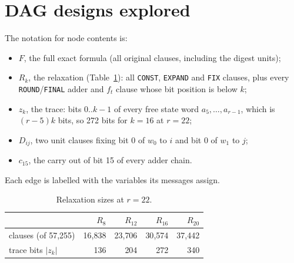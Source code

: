 \documentclass[11pt,a4paper]{article}
\begin{document}
\section{DAG designs explored}\label{sec:dags}

The notation for node contents is:
\begin{itemize}
\item $F$, the full exact formula (all original clauses, including the digest units);
\item $R_k$, the relaxation (Table~\ref{tab:relax}): all \texttt{CONST}, \texttt{EXPAND} and
\texttt{FIX} clauses, plus every \texttt{ROUND}/\texttt{FINAL} adder and $f_t$ clause whose bit
position is below $k$;
\item $z_k$, the trace: bits $0..k-1$ of every free state word $a_5,\dots,a_{r-1}$, which is
$(r-5)k$ bits, so 272 bits for $k=16$ at $r=22$;
\item $D_{ij}$, two unit clauses fixing bit 0 of $w_0$ to $i$ and bit 0 of $w_1$ to $j$;
\item $c_{15}$, the carry out of bit 15 of every adder chain.
\end{itemize}
Each edge is labelled with the variables its messages assign.

\begin{table}[h]\centering\small
\begin{tabular}{@{}lrrrr@{}}
\toprule
 & $R_8$ & $R_{12}$ & $R_{16}$ & $R_{20}$\\
\midrule
clauses (of 57{,}255) & 16{,}838 & 23{,}706 & 30{,}574 & 37{,}442\\
trace bits $|z_k|$ & 136 & 204 & 272 & 340\\
\bottomrule
\end{tabular}
\caption{Relaxation sizes at $r=22$.}
\label{tab:relax}
\end{table}
\end{document}

